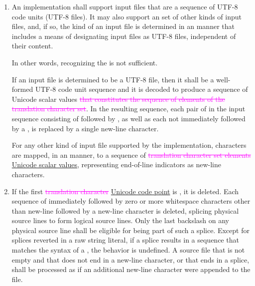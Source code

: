 \documentclass{wg21}
\newcommand{\addedTranslation}[1]{\textcolor{addclrTwo}{\uline{#1}}}
\newcommand{\removedTranslation}[1]{\textcolor{magenta}{\sout{#1}}}
\newcommand{\changedTranslation}[2]{\removedTranslation{#1} \addedTranslation{#2}}
\newcommand{\changeducs}[1]{\textcolor{noteclr}{#1}}
\begin{document}
\begin{enumerate}
    \item
    An implementation shall support input files
    that are a sequence of UTF-8 code units (UTF-8 files).
    It may also support
    an  set of other kinds of input files, and,
    if so, the kind of an input file is determined in
    an  manner
    that includes a means of designating input files as UTF-8 files,
    independent of their content.
    \begin{note}
        In other words,
        recognizing the  is not sufficient.
    \end{note}
    If an input file is determined to be a UTF-8 file,
    then it shall be a well-formed UTF-8 code unit sequence and
    it is decoded to produce a sequence of \changeducs{Unicode} scalar values
    \removedTranslation{that constitutes the sequence of elements of the translation character set}.
    In the resulting sequence,
    each pair of  in the input sequence consisting of
     followed by ,
    as well as each
     not immediately followed by a ,
    is replaced by a single new-line character.

    For any other kind of input file supported by the implementation,
     characters are mapped, in an
     manner,
    to a sequence of \changedTranslation{translation character set elements}{Unicode scalar values},
    representing end-of-line indicators as new-line characters.

    \item
    If the first \changedTranslation{translation character}{Unicode code point} is ,
    it is deleted.
    Each sequence of 
    immediately followed by
    zero or more whitespace characters other than new-line followed by
    a new-line character is deleted, splicing
    physical source lines to form logical source lines. Only the last
    backslash on any physical source line shall be eligible for being part
    of such a splice.
    Except for splices reverted in a raw string literal, if a splice results in
    a  sequence that matches the
    syntax of a , the behavior is
    undefined. A source file that is not empty and that does not end in a new-line
    character, or that ends in a splice,
    shall be processed as if an additional new-line character were appended
    to the file.


\end{enumerate}
\end{document}
